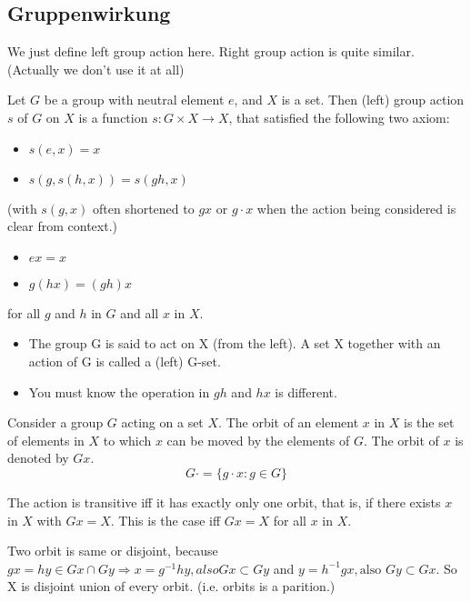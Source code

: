 \subsection{Gruppenwirkung}

We just define left group action here. Right group action is quite similar.(Actually we don't use it at all)
\begin{definition}
    Let $G$ be a group with neutral element $e$, and \(X\) is a set. Then (left) group action $s$ of $G$ on $X$ is a function \(s:G\times X \to X\), that satisfied the following two axiom: 
    \begin{itemize}
        \item $s(e,x) = x$
        \item \(s(g,s(h,x)) = s(gh,x)\)
    \end{itemize}
    (with $s(g,x)$ often shortened to $gx$ or $g\cdot x $ when the action being considered is clear from context.)
    \begin{itemize}
        \item $ex = x$
        \item \(g(hx) = (gh)x\)
    \end{itemize}
    for all $g$ and $h$ in $G$ and all $x$ in $X$.
\end{definition}

\begin{remark}
    \begin{itemize}
        \item The group G is said to act on X (from the left). A set X together with an action of G is called a (left) G-set.
        \item You must know the operation in $gh$ and $hx$ is different.
    \end{itemize}
\end{remark}

\begin{definition}
    Consider a group $G$ acting on a set $X$. The orbit of an element $x$ in $X$ is the set of elements in $X$ to which $x$ can be moved by the elements of $G$. The orbit of $x$ is denoted by $Gx$. $$G\cdot = \{g\cdot x :g \in G\}$$
\end{definition}

\begin{remark}
    \item  The action is transitive iff it has exactly only one orbit, that is, if there exists $x$ in $X$ with $Gx =X$. This is the case iff $Gx= X$ for all $x$ in $X$.
    \item Two orbit is same or disjoint, because $gx = hy \in Gx\cap Gy\Rightarrow x = g^{-1}hy, also Gx\subset Gy$ and $y = h^{-1}gx, \text{also }  Gy\subset Gx$. So X is disjoint union of every orbit. (i.e. orbits is a parition.)
\end{remark}

